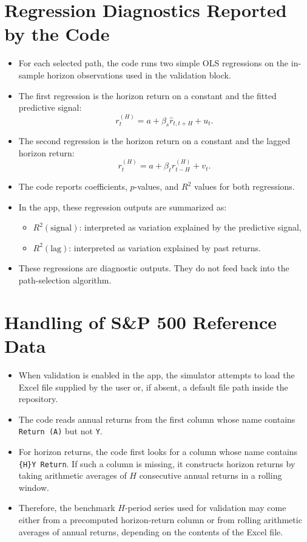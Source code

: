 \documentclass[11pt]{article}
\begin{document}
\section*{Regression Diagnostics Reported by the Code}
\begin{itemize}
\item For each selected path, the code runs two simple OLS regressions on the in-sample horizon observations used in the validation block.
\item The first regression is the horizon return on a constant and the fitted predictive signal:
\[
r_t^{(H)} = a + \beta_s \hat r_{t,t+H} + u_t.
\]
\item The second regression is the horizon return on a constant and the lagged horizon return:
\[
r_t^{(H)} = a + \beta_{\ell} r_{t-H}^{(H)} + v_t.
\]
\item The code reports coefficients, \(p\)-values, and \(R^2\) values for both regressions.
\item In the app, these regression outputs are summarized as:
\begin{itemize}
\item \(R^2(\text{signal})\): interpreted as variation explained by the predictive signal,
\item \(R^2(\text{lag})\): interpreted as variation explained by past returns.
\end{itemize}
\item These regressions are diagnostic outputs. They do not feed back into the path-selection algorithm.
\end{itemize}

\section*{Handling of S\&P 500 Reference Data}
\begin{itemize}
\item When validation is enabled in the app, the simulator attempts to load the Excel file supplied by the user or, if absent, a default file path inside the repository.
\item The code reads annual returns from the first column whose name contains \texttt{Return (A)} but not \texttt{Y}.
\item For horizon returns, the code first looks for a column whose name contains \texttt{\{H\}Y Return}. If such a column is missing, it constructs horizon returns by taking arithmetic averages of \(H\) consecutive annual returns in a rolling window.
\item Therefore, the benchmark \(H\)-period series used for validation may come either from a precomputed horizon-return column or from rolling arithmetic averages of annual returns, depending on the contents of the Excel file.
\end{itemize}
\end{document}
